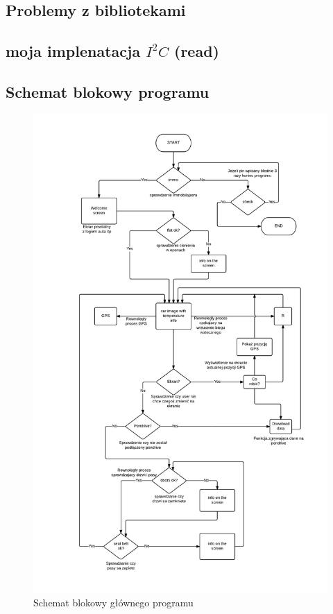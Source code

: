 \documentclass{xmgr}
\begin{document}
\subsection{Problemy z bibliotekami}
\subsection{moja implenatacja $I^2C$ (read)}
\subsection{Schemat blokowy programu}

\begin{figure}[!htb]
    \centering
    \includegraphics[height=0.4\textheight]{images/schemat_blokowy.png}
    \caption{Schemat blokowy głównego programu\label{SchematBlokowy}}
\end{figure}
\end{document}
